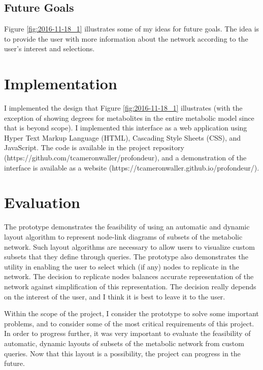 \subsection{Future Goals}

Figure \ref{fig:2016-11-18_1} illustrates some of my ideas for future goals.
The idea is to provide the user with more information about the network according to the user's interest and selections.

\section{Implementation}

I implemented the design that Figure \ref{fig:2016-11-18_1} illustrates (with the exception of showing degrees for metabolites in the entire metabolic model since that is beyond scope).
I implemented this interface as a web application using Hyper Text Markup Language (HTML), Cascading Style Sheets (CSS), and JavaScript.
The code is available in the project repository (https://github.com/tcameronwaller/profondeur), and a demonstration of the interface is available as a website (https://tcameronwaller.github.io/profondeur/).

\section{Evaluation}

The prototype demonstrates the feasibility of using an automatic and dynamic layout algorithm to represent node-link diagrams of subsets of the metabolic network.
Such layout algorithms are necessary to allow users to visualize custom subsets that they define through queries.
The prototype also demonstrates the utility in enabling the user to select which (if any) nodes to replicate in the network.
The decision to replicate nodes balances accurate representation of the network against simplification of this representation.
The decision really depends on the interest of the user, and I think it is best to leave it to the user.

Within the scope of the project, I consider the prototype to solve some important problems, and to consider some of the most critical requirements of this project.
In order to progress further, it was very important to evaluate the feasibility of automatic, dynamic layouts of subsets of the metabolic network from custom queries.
Now that this layout is a possibility, the project can progress in the future.